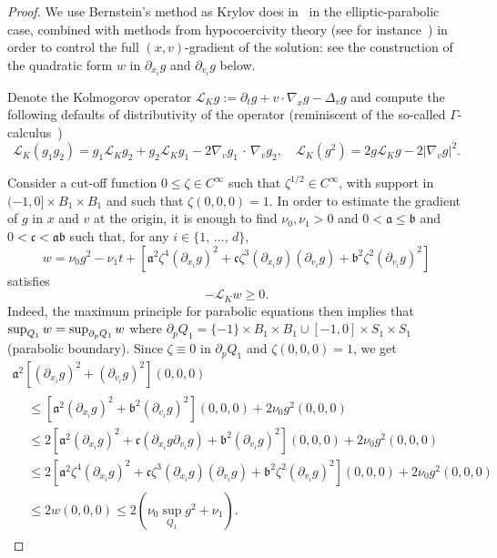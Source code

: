 \documentclass[AHL,Unicode,longabstracts,published]{cedram}
\newcommand{\cL}{\mathcal{L}}
\newcommand{\frka}{\mathfrak{a}}
\newcommand{\frkb}{\mathfrak{b}}
\newcommand{\frkc}{\mathfrak{c}}
\begin{document}
\begin{proof}
We use Bernstein's method as Krylov does in~\cite{krylov1996} in the elliptic-parabolic case, combined with methods from hypocoercivity theory (see for instance~\cite{villani2009memoir}) in order to control the full $(x,v)$-gradient of the solution: see the construction of the quadratic form $w$ in $\partial_{x_i} g$ and $\partial_{v_i} g$ below.

Denote the Kolmogorov operator $\cL_K g := \partial_t g + v \cdot \nabla_x g - \Delta_v g$ and compute the following defaults of distributivity of the operator (reminiscent of the so-called $\Gamma$-calculus~\cite{MR889476})
\begin{equation}\label{eq:square}
\cL_K(g_1g_2) = g_1 \cL_K g_2 + g_2 \cL_K g_1 - 2 \nabla_v g_1\,\cdot\,\nabla_v g_2,\quad \cL_K (g^2) = 2 g \cL_K g - 2 \left| \nabla_v g \right|^2.
\end{equation}


Consider a cut-off function $0 \le \zeta \in C^\infty$ such that $\zeta^{1/2} \in C^\infty$, with support in $(-1,0] \times B_1 \times B_1$ and such that $\zeta(0,0,0)=1$. In order to estimate the gradient of $g$ in $x$ and $v$ at the origin, it is enough to find $\nu_0, \nu_1>0$ and $0 < \frka \le \frkb$ and $0 < \frkc < \frka \frkb$ such that, for any $i \in \{1,\,\dots,\,d\}$,
\[
w = \nu_0 g^2 - \nu_1 t + \left[\frka^2 \zeta^4 (\partial_{x_i}g)^2 + \frkc \zeta^3 (\partial_{x_i} g)(\partial_{v_i}g) + \frkb^2 \zeta^2 (\partial_{v_i}g)^2\right]
\]
satisfies
\[
- \cL_K w \ge 0.
\]
Indeed, the maximum principle for parabolic equations then implies that $\sup_{Q_1} w \linebreak= \sup_{\partial_p Q_1} w$ where $\partial_p Q_1 = \{-1\} \times B_1 \times B_1 \cup [-1,0] \times S_1 \times S_1$ (parabolic boundary). Since $\zeta \equiv 0$ in $\partial_p Q_1$ and $\zeta (0,0,0) =1$, we get
\begin{multline}\label{eq:cs}
\frka^2 \left[\left(\partial_{x_i}g\right)^2 + (\partial_{v_i}g)^2
\right](0,0,0)\\
\begin{aligned}
 &\le \left[\frka^2 (\partial_{x_i}g)^2 + \frkb^2 (\partial_{v_i}g)^2
\right](0,0,0)+ 2 \nu_0 g^2(0,0,0) \\
& \le 2 \left[\frka^2 (\partial_{x_i}g)^2 +
\frkc (\partial_{x_i} g \partial_{v_i}g) + \frkb^2 (\partial_{v_i}g)^2
\right](0,0,0) + 2 \nu_0 g^2(0,0,0) \\
&\le 2 \left[\frka^2 \zeta^4(\partial_{x_i}g)^2 + \frkc \zeta^3(\partial_{x_i} g)(\partial_{v_i}g) + \frkb^2 \zeta^2(\partial_{v_i}g)^2 \right](0,0,0) + 2 \nu_0 g^2(0,0,0) \\
& \le 2 w(0,0,0) \le 2 \left(\nu_0 \sup_{Q_1} g^2 + \nu_1\right).
\end{aligned}
\end{multline}


\end{proof}
\end{document}

